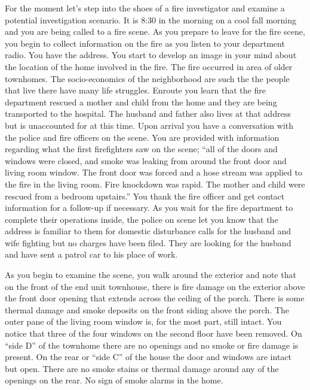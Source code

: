 \documentclass[twoside]{uocthesis}
\begin{document}
{For the moment let's step into the shoes of a fire investigator and examine a potential investigation scenario.  It is 8:30 in the morning on a cool fall morning and you are being called to a fire scene.  As you prepare to leave for the fire scene, you begin to collect information on the fire as you listen to your department radio.  You have the address.  You start to develop an image in your mind about the location of the home involved in the fire. The fire occurred in area of older townhomes.  The socio-economics of the neighborhood are such the the people that live there have many life struggles. Enroute you learn that the fire department rescued a mother and child from the home and they are being transported to the hospital.  The husband and father also lives at that address but is unaccounted for at this time.  Upon arrival you have a conversation with the police and fire officers on the scene.  You are provided with information regarding what the first firefighters saw on the scene; ``all of the doors and windows were closed, and smoke was leaking from around the front door and living room window.  The front door was forced and a hose stream was applied to the fire in the living room.  Fire knockdown was rapid.  The mother and child were rescued from a bedroom upstairs.'' You thank the fire officer and get contact information for a follow-up if necessary.  As you wait for the fire department to complete their operations inside, the police on scene let you know that the address is familiar to them for domestic disturbance calls for the husband and wife fighting but no charges have been filed.  They are looking for the husband and have sent a patrol car to his place of work.  

As you begin to examine the scene, you walk around the exterior and note that on the front of the end unit townhouse, there is fire damage on the exterior above the front door opening that extends across the ceiling of the porch.  There is some thermal damage and smoke deposits on the front siding above the porch.  The outer pane of the living room window is, for the most part, still intact. You notice that three of the four windows on the second floor have been removed.  On ``side D'' of the townhome there are no openings and no smoke or fire damage is present.  On the rear or ``side C'' of the house the door and windows are intact but open.  There are no smoke stains or thermal damage around any of the openings on the rear. No sign of smoke alarms in the home. 

}
\end{document}
